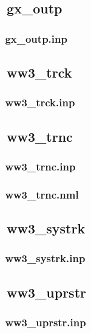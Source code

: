 \vssub
\subsection{~gx\_outp}
\vsssub
\subsubsection{~gx\_outp.inp} \label{sec:config181}
\vsssub
\vssub


\vssub
\subsection{~ww3\_trck}
\vsssub
\subsubsection{~ww3\_trck.inp} \label{sec:config191}
\vsssub
\vssub


\vssub
\subsection{~ww3\_trnc}
\vsssub
\subsubsection{~ww3\_trnc.inp} \label{sec:config201}
\vsssub
\vsssub
\subsubsection{~ww3\_trnc.nml} \label{sec:config202}
\vsssub
\vssub


\vssub
\subsection{~ww3\_systrk}
\vsssub
\subsubsection{~ww3\_systrk.inp} \label{sec:config211}
\vsssub
\vssub


\vssub
\subsection{~ww3\_uprstr}
\vsssub
\subsubsection{~ww3\_uprstr.inp} \label{sec:config221}
\vsssub
\vssub



\bpage \pagestyle{empty}

